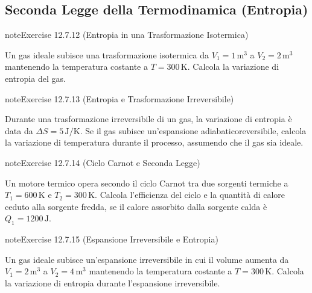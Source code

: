 \documentclass[letterpaper,10pt,italian]{jupyterBook}
\begin{document}
\subsection{Seconda Legge della Termodinamica (Entropia)}
\label{\detokenize{ch/thermodynamics/principles-problems:seconda-legge-della-termodinamica-entropia}} \label{exercise:ch/thermodynamics/principles-problems-exercise-11}

\begin{sphinxadmonition}{note}{Exercise 12.7.12 (Entropia in una Trasformazione Isotermica)}



\sphinxAtStartPar
Un gas ideale subisce una trasformazione isotermica da \(V_1 = 1 \, \text{m}^3\) a \(V_2 = 2 \, \text{m}^3\) mantenendo la temperatura costante a \(T = 300 \, \text{K}\). Calcola la variazione di entropia del gas.
\end{sphinxadmonition}
 \label{exercise:ch/thermodynamics/principles-problems-exercise-12}

\begin{sphinxadmonition}{note}{Exercise 12.7.13 (Entropia e Trasformazione Irreversibile)}



\sphinxAtStartPar
Durante una trasformazione irreversibile di un gas, la variazione di entropia è data da \(\Delta S = 5 \, \text{J/K}\). Se il gas subisce un’espansione adiabatico\sphinxhyphen{}reversibile, calcola la variazione di temperatura durante il processo, assumendo che il gas sia ideale.
\end{sphinxadmonition}
 \label{exercise:ch/thermodynamics/principles-problems-exercise-13}

\begin{sphinxadmonition}{note}{Exercise 12.7.14 (Ciclo Carnot e Seconda Legge)}



\sphinxAtStartPar
Un motore termico opera secondo il ciclo Carnot tra due sorgenti termiche a \(T_1 = 600 \, \text{K}\) e \(T_2 = 300 \, \text{K}\). Calcola l’efficienza del ciclo e la quantità di calore ceduto alla sorgente fredda, se il calore assorbito dalla sorgente calda è \(Q_1 = 1200 \, \text{J}\).
\end{sphinxadmonition}
 \label{exercise:ch/thermodynamics/principles-problems-exercise-14}

\begin{sphinxadmonition}{note}{Exercise 12.7.15 (Espansione Irreversibile e Entropia)}



\sphinxAtStartPar
Un gas ideale subisce un’espansione irreversibile in cui il volume aumenta da \(V_1 = 2 \, \text{m}^3\) a \(V_2 = 4 \, \text{m}^3\) mantenendo la temperatura costante a \(T = 300 \, \text{K}\). Calcola la variazione di entropia durante l’espansione irreversibile.
\end{sphinxadmonition}
 \label{exercise:ch/thermodynamics/principles-problems-exercise-15}
\end{document}
